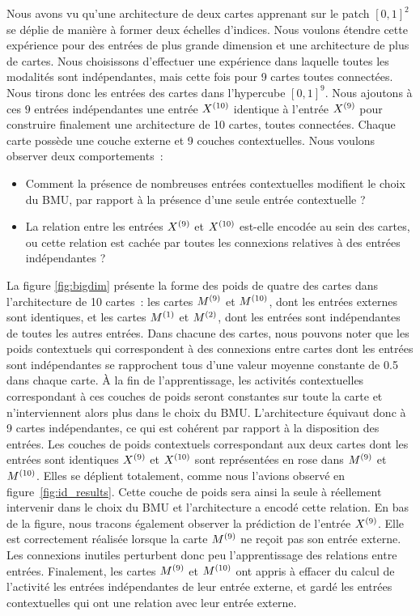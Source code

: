 \documentclass[../main]{subfiles}
\begin{document}
Nous avons vu qu'une architecture de deux cartes apprenant sur le patch $[0,1]^2$ se déplie de manière à former deux échelles d'indices. 
Nous voulons étendre cette expérience pour des entrées de plus grande dimension et une architecture de plus de cartes. 
Nous choisissons d'effectuer une expérience dans laquelle toutes les modalités sont indépendantes, mais cette fois pour 9 cartes toutes connectées.
Nous tirons donc les entrées des cartes dans l'hypercube $[0,1]^9$. 
Nous ajoutons à ces $9$ entrées indépendantes une entrée $X^{({10})}$ identique à l'entrée $X^{({9})}$ pour construire finalement une architecture de 10 cartes, toutes connectées. Chaque carte possède une couche externe et 9 couches contextuelles.
Nous voulons observer deux comportements~: 
\begin{itemize}
	\item Comment la présence de nombreuses entrées contextuelles modifient le choix du BMU, par rapport à la présence d'une seule entrée contextuelle ? 
	\item La relation entre les entrées $X^{({9})}$ et $X^{({10})}$ est-elle encodée au sein des cartes, ou cette relation est cachée par toutes les connexions relatives à des entrées indépendantes ? 
\end{itemize}

La figure \ref{fig:bigdim} présente la forme des poids de quatre des cartes dans l'architecture de 10 cartes~: les cartes $M^{({9})}$ et $M^{({10})}$, dont les entrées externes sont identiques, et les cartes $M^{({1})}$ et $M^{({2})}$, dont les entrées sont indépendantes de toutes les autres entrées.
Dans chacune des cartes, nous pouvons noter que les poids contextuels qui correspondent à des connexions entre cartes dont les entrées sont indépendantes se rapprochent tous d'une valeur moyenne constante de 0.5 dans chaque carte. \`A la fin de l'apprentissage, les activités contextuelles correspondant à ces couches de poids seront constantes sur toute la carte et n'interviennent alors plus dans le choix du BMU.
L'architecture équivaut donc à 9 cartes indépendantes, ce qui est cohérent par rapport à la disposition des entrées. 
Les couches de poids contextuels correspondant aux deux cartes dont les entrées sont identiques $X^{({9})}$ et $X^{({10})}$ sont représentées en rose dans $M^{({9})}$ et $M^{({10})}$. 
Elles se déplient totalement, comme nous l'avions observé en figure~\ref{fig:id_results}. Cette couche de poids sera ainsi la seule à réellement intervenir dans le choix du BMU et l'architecture a encodé cette relation.
En bas de la figure, nous tracons également observer la prédiction de l'entrée $X^{({9})}$. 
Elle est correctement réalisée lorsque la carte $M^{({9})}$ ne reçoit pas son entrée externe. Les connexions \og inutiles \fg{} perturbent donc peu l'apprentissage des relations entre entrées. 
Finalement, les cartes $M^{({9})}$ et $M^{({10})}$ ont appris à effacer du calcul de l'activité les entrées indépendantes de leur entrée externe, et gardé les entrées contextuelles qui ont une relation avec leur entrée externe.
\end{document}

